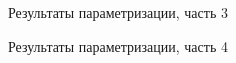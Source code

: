 \clearpage
\begin{figure}[h!]
	
	
	\caption{Результаты параметризации, часть 3}
	
	\label{fig:tab3}
	
\end{figure}

\clearpage
\begin{figure}[h!]
	
	
	\caption{Результаты параметризации, часть 4}
	
	\label{fig:tab4}
	
\end{figure}

